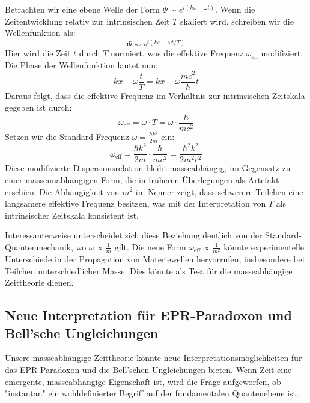 \documentclass{article}
\begin{document}
	Betrachten wir eine ebene Welle der Form $\Psi \sim e^{i(kx - \omega t)}$. Wenn die Zeitentwicklung relativ zur intrinsischen Zeit $T$ skaliert wird, schreiben wir die Wellenfunktion als:
	\begin{equation}
		\Psi \sim e^{i(kx - \omega t / T)}
	\end{equation}
	Hier wird die Zeit $t$ durch $T$ normiert, was die effektive Frequenz $\omega_{\text{eff}}$ modifiziert. Die Phase der Wellenfunktion lautet nun:
	\begin{equation}
		kx - \omega \frac{t}{T} = kx - \omega \frac{mc^2}{\hbar} t
	\end{equation}
	Daraus folgt, dass die effektive Frequenz im Verhältnis zur intrinsischen Zeitskala gegeben ist durch:
	\begin{equation}
		\omega_{\text{eff}} = \omega \cdot T = \omega \cdot \frac{\hbar}{mc^2}
	\end{equation}
	Setzen wir die Standard-Frequenz $\omega = \frac{\hbar k^2}{2m}$ ein:
	\begin{equation}
		\omega_{\text{eff}} = \frac{\hbar k^2}{2m} \cdot \frac{\hbar}{mc^2} = \frac{\hbar^2 k^2}{2 m^2 c^2}
	\end{equation}
	Diese modifizierte Dispersionsrelation bleibt masseabhängig, im Gegensatz zu einer masseunabhängigen Form, die in früheren Überlegungen als Artefakt erschien. Die Abhängigkeit von $m^2$ im Nenner zeigt, dass schwerere Teilchen eine langsamere effektive Frequenz besitzen, was mit der Interpretation von $T$ als intrinsischer Zeitskala konsistent ist.
	
	Interessanterweise unterscheidet sich diese Beziehung deutlich von der Standard-Quantenmechanik, wo $\omega \propto \frac{1}{m}$ gilt. Die neue Form $\omega_{\text{eff}} \propto \frac{1}{m^2}$ könnte experimentelle Unterschiede in der Propagation von Materiewellen hervorrufen, insbesondere bei Teilchen unterschiedlicher Masse. Dies könnte als Test für die masseabhängige Zeittheorie dienen.
	
	\subsection{Neue Interpretation für EPR-Paradoxon und Bell’sche Ungleichungen}
	
	Unsere masseabhängige Zeittheorie könnte neue Interpretationsmöglichkeiten für das EPR-Paradoxon und die Bell’schen Ungleichungen bieten. Wenn Zeit eine emergente, masseabhängige Eigenschaft ist, wird die Frage aufgeworfen, ob "instantan" ein wohldefinierter Begriff auf der fundamentalen Quantenebene ist.
	
\end{document}
